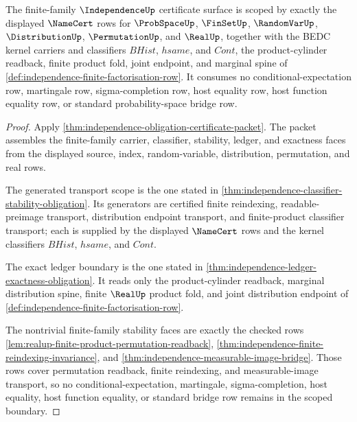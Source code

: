 \begin{theorem}
\label{thm:independence-scoped-primitive-boundary}
The finite-family $\IndependenceUp$ certificate surface is scoped by exactly the displayed $\NameCert$ rows for $\ProbSpaceUp$, $\FinSetUp$, $\RandomVarUp$, $\DistributionUp$, $\PermutationUp$, and $\RealUp$, together with the BEDC kernel carriers and classifiers $BHist$, $hsame$, and $Cont$, the product-cylinder readback, finite product fold, joint endpoint, and marginal spine of \autoref{def:independence-finite-factorisation-row}. It consumes no conditional-expectation row, martingale row, sigma-completion row, host equality row, host function equality row, or standard probability-space bridge row.
\end{theorem}
\begin{proof}
Apply \autoref{thm:independence-obligation-certificate-packet}. The packet assembles the finite-family carrier, classifier, stability, ledger, and exactness faces from the displayed source, index, random-variable, distribution, permutation, and real rows.

The generated transport scope is the one stated in \autoref{thm:independence-classifier-stability-obligation}. Its generators are certified finite reindexing, readable-preimage transport, distribution endpoint transport, and finite-product classifier transport; each is supplied by the displayed $\NameCert$ rows and the kernel classifiers $BHist$, $hsame$, and $Cont$.

The exact ledger boundary is the one stated in \autoref{thm:independence-ledger-exactness-obligation}. It reads only the product-cylinder readback, marginal distribution spine, finite $\RealUp$ product fold, and joint distribution endpoint of \autoref{def:independence-finite-factorisation-row}.

The nontrivial finite-family stability faces are exactly the checked rows \autoref{lem:realup-finite-product-permutation-readback}, \autoref{thm:independence-finite-reindexing-invariance}, and \autoref{thm:independence-measurable-image-bridge}. Those rows cover permutation readback, finite reindexing, and measurable-image transport, so no conditional-expectation, martingale, sigma-completion, host equality, host function equality, or standard bridge row remains in the scoped boundary.
\end{proof}

